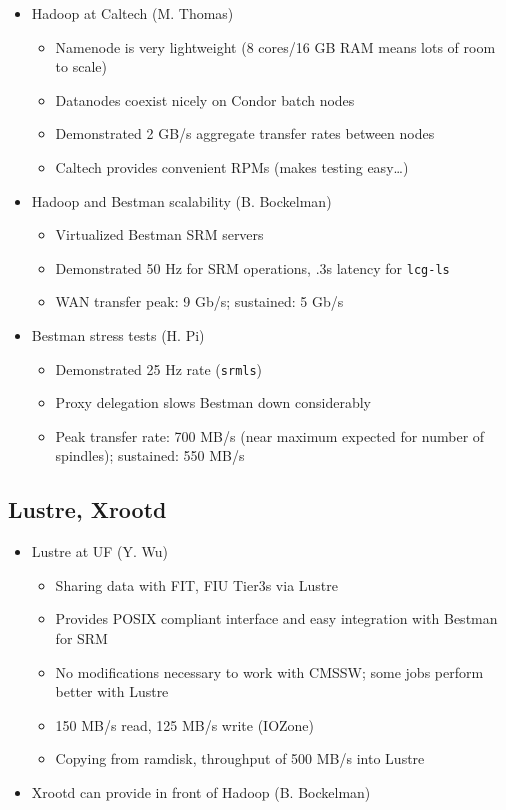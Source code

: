 \documentclass{beamer}
\begin{document}
\begin{frame}
\begin{itemize}
	\item Hadoop at Caltech (M. Thomas)
	\begin{itemize}
		\item Namenode is very lightweight (8 cores/16 GB RAM means lots of room to scale)
		\item Datanodes coexist nicely on Condor batch nodes
		\item Demonstrated 2 GB/s aggregate transfer rates between nodes
		\item Caltech provides convenient RPMs (makes testing easy\ldots{})
	\end{itemize}
	\item Hadoop and Bestman scalability (B. Bockelman)
	\begin{itemize}
		\item Virtualized Bestman SRM servers
		\item Demonstrated 50 Hz for SRM operations, .3s latency for {\tt lcg-ls}
		\item WAN transfer peak: 9 Gb/s; sustained: 5 Gb/s
	\end{itemize}
	\item Bestman stress tests (H. Pi)
	\begin{itemize}
		\item Demonstrated 25 Hz rate ({\tt srmls})
		\item Proxy delegation slows Bestman down considerably
		\item Peak transfer rate: 700 MB/s (near maximum expected for number of spindles); sustained: 550 MB/s
	\end{itemize}
\end{itemize}
\end{frame}

\subsection{Lustre, Xrootd}

\begin{frame}
\begin{itemize}
	\item Lustre at UF (Y. Wu)
	\begin{itemize}
		\item Sharing data with FIT, FIU Tier3s via Lustre
		\item Provides POSIX compliant interface and easy integration with Bestman for SRM
		\item No modifications necessary to work with CMSSW; some jobs perform better with Lustre
		\item 150 MB/s read, 125 MB/s write (IOZone)
		\item Copying from ramdisk, throughput of 500 MB/s into Lustre
	\end{itemize}
	\item Xrootd can provide in front of Hadoop (B. Bockelman)
\end{itemize}
\end{frame}
\end{document}
